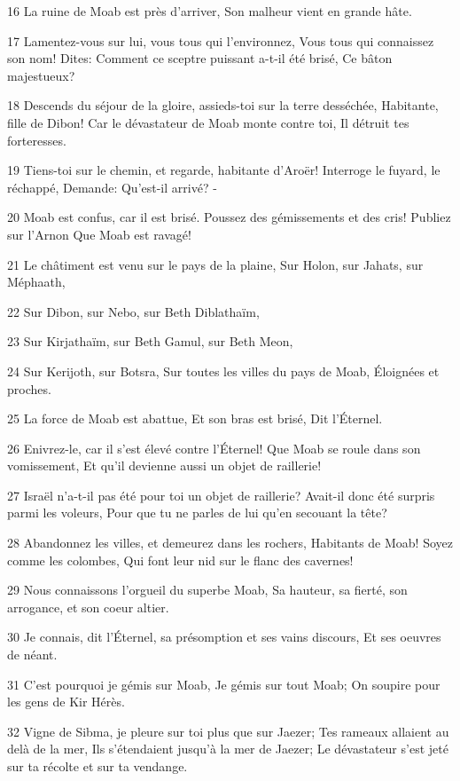 \par 16 La ruine de Moab est près d'arriver, Son malheur vient en grande hâte.
\par 17 Lamentez-vous sur lui, vous tous qui l'environnez, Vous tous qui connaissez son nom! Dites: Comment ce sceptre puissant a-t-il été brisé, Ce bâton majestueux?
\par 18 Descends du séjour de la gloire, assieds-toi sur la terre desséchée, Habitante, fille de Dibon! Car le dévastateur de Moab monte contre toi, Il détruit tes forteresses.
\par 19 Tiens-toi sur le chemin, et regarde, habitante d'Aroër! Interroge le fuyard, le réchappé, Demande: Qu'est-il arrivé? -
\par 20 Moab est confus, car il est brisé. Poussez des gémissements et des cris! Publiez sur l'Arnon Que Moab est ravagé!
\par 21 Le châtiment est venu sur le pays de la plaine, Sur Holon, sur Jahats, sur Méphaath,
\par 22 Sur Dibon, sur Nebo, sur Beth Diblathaïm,
\par 23 Sur Kirjathaïm, sur Beth Gamul, sur Beth Meon,
\par 24 Sur Kerijoth, sur Botsra, Sur toutes les villes du pays de Moab, Éloignées et proches.
\par 25 La force de Moab est abattue, Et son bras est brisé, Dit l'Éternel.
\par 26 Enivrez-le, car il s'est élevé contre l'Éternel! Que Moab se roule dans son vomissement, Et qu'il devienne aussi un objet de raillerie!
\par 27 Israël n'a-t-il pas été pour toi un objet de raillerie? Avait-il donc été surpris parmi les voleurs, Pour que tu ne parles de lui qu'en secouant la tête?
\par 28 Abandonnez les villes, et demeurez dans les rochers, Habitants de Moab! Soyez comme les colombes, Qui font leur nid sur le flanc des cavernes!
\par 29 Nous connaissons l'orgueil du superbe Moab, Sa hauteur, sa fierté, son arrogance, et son coeur altier.
\par 30 Je connais, dit l'Éternel, sa présomption et ses vains discours, Et ses oeuvres de néant.
\par 31 C'est pourquoi je gémis sur Moab, Je gémis sur tout Moab; On soupire pour les gens de Kir Hérès.
\par 32 Vigne de Sibma, je pleure sur toi plus que sur Jaezer; Tes rameaux allaient au delà de la mer, Ils s'étendaient jusqu'à la mer de Jaezer; Le dévastateur s'est jeté sur ta récolte et sur ta vendange.

